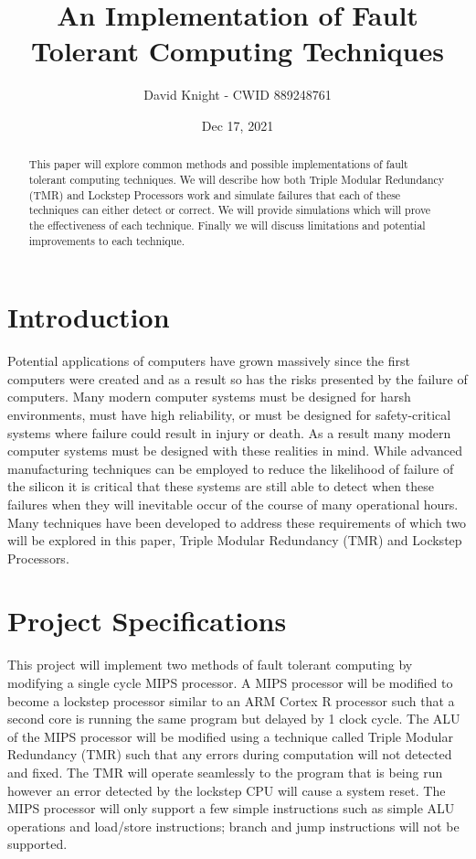 \documentclass[12pt]{article}
\title{
    An Implementation of Fault Tolerant Computing Techniques\\
}
\author{
    David Knight - CWID 889248761\\
}
\date{Dec 17, 2021}
\begin{document}
\maketitle

\begin{abstract}
This paper will explore common methods and possible implementations of fault tolerant computing techniques. We will describe how both Triple Modular Redundancy (TMR) and Lockstep Processors work and simulate failures that each of these techniques can either detect or correct. We will provide simulations which will prove the effectiveness of each technique. Finally we will discuss limitations and potential improvements to each technique.
\end{abstract}

\section{Introduction}
Potential applications of computers have grown massively since the first computers were created and as a result so has the risks presented by the failure of computers. Many modern computer systems must be designed for harsh environments, must have high reliability, or must be designed for safety-critical systems where failure could result in injury or death. As a result many modern computer systems must be designed with these realities in mind. While advanced manufacturing techniques can be employed to reduce the likelihood of failure of the silicon it is critical that these systems are still able to detect when these failures when they will inevitable occur of the course of many operational hours. Many techniques have been developed to address these requirements of which two will be explored in this paper, Triple Modular Redundancy (TMR) and Lockstep Processors.

\section{Project Specifications}
This project will implement two methods of fault tolerant computing by modifying a single cycle MIPS processor. A MIPS processor will be modified to become a lockstep processor similar to an ARM Cortex R processor such that a second core is running the same program but delayed by 1 clock cycle. The ALU of the MIPS processor will be modified using a technique called Triple Modular Redundancy (TMR) such that any errors during computation will not detected and fixed. The TMR will operate seamlessly to the program that is being run however an error detected by the lockstep CPU will cause a system reset. The MIPS processor will only support a few simple instructions such as simple ALU operations and load/store instructions; branch and jump instructions will not be supported.
\end{document}
